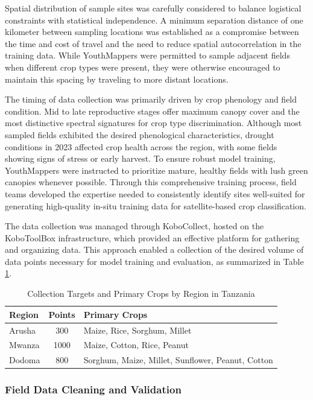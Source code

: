\documentclass[
  journal,
  twocolumn]{IEEEtran}
\begin{document}
Spatial distribution of sample sites was carefully considered to balance
logistical constraints with statistical independence. A minimum
separation distance of one kilometer between sampling locations was
established as a compromise between the time and cost of travel and the
need to reduce spatial autocorrelation in the training data. While
YouthMappers were permitted to sample adjacent fields when different
crop types were present, they were otherwise encouraged to maintain this
spacing by traveling to more distant locations.

The timing of data collection was primarily driven by crop phenology and
field condition. Mid to late reproductive stages offer maximum canopy
cover and the most distinctive spectral signatures for crop type
discrimination. Although most sampled fields exhibited the desired
phenological characteristics, drought conditions in 2023 affected crop
health across the region, with some fields showing signs of stress or
early harvest. To ensure robust model training, YouthMappers were
instructed to prioritize mature, healthy fields with lush green canopies
whenever possible. Through this comprehensive training process, field
teams developed the expertise needed to consistently identify sites
well-suited for generating high-quality in-situ training data for
satellite-based crop classification.

The data collection was managed through KoboCollect, hosted on the
KoboToolBox infrastructure, which provided an effective platform for
gathering and organizing data. This approach enabled a collection of the
desired volume of data points necessary for model training and
evaluation, as summarized in Table \ref{tab:data_n}.

\begin{table}[h!]
\centering
\small
\begin{tabular}{@{}lcp{4.5cm}@{}}
\toprule
\textbf{Region} & \textbf{Points} & \textbf{Primary Crops} \\
\midrule
Arusha & 300 & Maize, Rice, Sorghum, Millet \\
\midrule
Mwanza & 1000 & Maize, Cotton, Rice, Peanut \\
\midrule
Dodoma & 800 & Sorghum, Maize, Millet, Sunflower, Peanut, Cotton \\
\bottomrule
\end{tabular}
\caption{Collection Targets and Primary Crops by Region in Tanzania}
\label{tab:data_n}
\end{table}

\hypertarget{field-data-cleaning-and-validation}{%
\subsubsection{Field Data Cleaning and
Validation}\label{field-data-cleaning-and-validation}}
\end{document}
